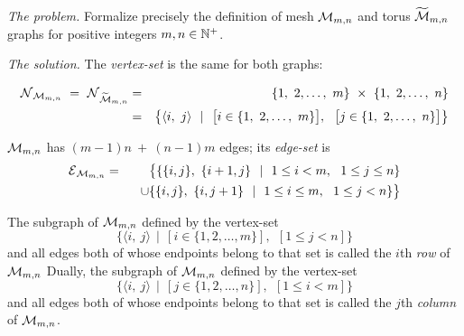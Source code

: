 \noindent \textit{The problem.}
Formalize precisely the definition of mesh  $\mbox{$\cal M$}_{m,n}$ and torus $\widetilde{\mbox{$\cal M$}}_{m,n}$ graphs
for positive integers $m, n \in \mathbb{N}^+$.
\medskip

\noindent \textit{The solution.}
The  {\it vertex-set} is the same for both graphs:

\begin{eqnarray*}
\n_{\fm_{m,n}} \ = \ \n_{\widetilde{\fm}_{m,n}}
  & = & 
\{1, \ 2, \ldots, \ m\} \ \times \ \{1, \ 2, \ldots, \ n\} \\
  & = & 
\big\{ \langle i, \ j \rangle \ \ | \ \ 
\big[ i \in \{1, \ 2, \ldots, \ m\} \big], \ \
\big[ j \in \{1, \ 2, \ldots, \ n\} \big]
\big\}
\end{eqnarray*}


$\mbox{$\cal M$}_{m,n}$ has $(m-1)n \ + \ (n-1)m$ edges; its {\it edge-set} is
\begin{eqnarray*}
\mbox{$\cal E$}_{\mbox{{\scriptsize $\cal M$}}_{m,n}} & = & 
\big\{
\{ \{ i, j \}, \ \{ i+1, j \} \ \ | \ \
1 \leq i < m, \ \ 1 \leq j \leq n \} \\
  &  & \hspace*{.1in} \cup
\{ \{ i, j \}, \ \{ i, j+1 \} \ \ | \ \
1 \leq i \leq m, \ \ 1 \leq j < n \}
\big\}
\end{eqnarray*}

\medskip

The subgraph of $\mbox{$\cal M$}_{m,n}$ defined by the vertex-set
\[ \{ \langle i, \ j \rangle  \ \ | \ \ \left[i \in \{1, 2, \ldots,
  m\}\right], \ \ \left[1 \leq j < n\right]\}
\]
and all edges both of whose endpoints belong to that set is called the
$i$th {\it row} of $\mbox{$\cal M$}_{m,n}$
Dually, the subgraph of $\mbox{$\cal M$}_{m,n}$ defined by the vertex-set
\[ \{ \langle i, \ j \rangle  \ \ | \ \ \left[j \in \{1, 2, \ldots,
  n\}\right], \ \ \left[1 \leq i < m\right] \}
\]
and all edges both of whose endpoints belong to that set is called the
$j$th {\it column} of $\mbox{$\cal M$}_{m,n}$.


